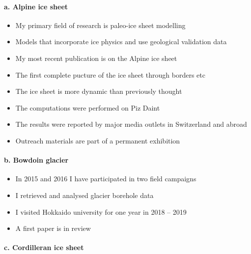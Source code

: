 \documentclass{article}
\begin{document}
\paragraph{a. Alpine ice sheet}

    \begin{itemize}
      \item{My primary field of research is paleo-ice sheet modelling}
      \item{Models that incorporate ice physics and use geological validation data}
      \item{My most recent publication is on the Alpine ice sheet}
      \item{The first complete pucture of the ice sheet through borders etc}
      \item{The ice sheet is more dynamic than previously thought}
      \item{The computations were performed on Piz Daint}
      \item{The results were reported by major media outlets in Switzerland and abroad}
      \item{Outreach materials are part of a permanent exhibition}
    \end{itemize}

\paragraph{b. Bowdoin glacier}

    \begin{itemize}
      \item{In 2015 and 2016 I have participated in two field campaigns}
      \item{I retrieved and analysed glacier borehole data}
      \item{I visited Hokkaido university for one year in 2018 -- 2019}
      \item{A first paper is in review}
    \end{itemize}

\paragraph{c. Cordilleran ice sheet}
\end{document}
